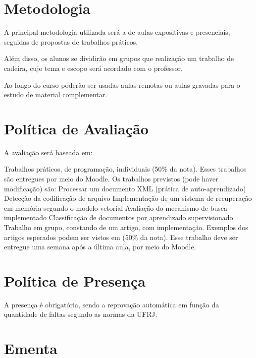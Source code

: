 \documentclass{article}
\begin{document}
\section{Metodologia}

A principal metodologia utilizada será a de aulas expositivas e presenciais, seguidas de propostas de trabalhos práticos.

Além disso, os alunos se dividirão em grupos que realização um trabalho de cadeira, cujo tema e escopo será acordado com o professor.

Ao longo do curso poderão ser usadas aulas remotas ou aulas gravadas para o estudo de material complementar.

\section{Política de Avaliação}

A avaliação será baseada em:
\begin{outline}
    \1 Trabalhos práticos, de programação, individuais (50\% da nota). Esses trabalhos são entregues por meio do Moodle. Os trabalhos previstos (pode haver modificação) são:
    \2 Processar um documento XML (prática de auto-aprendizado)
    \2 Detecção da codificação de arquivo
    \2 Implementação de um sistema de recuperação em memória segundo o modelo vetorial
    \2 Avaliação do mecanismo de busca implementado
    \2 Classificação de documentos por aprendizado supervisionado 
    \1 Trabalho em grupo, constando de um artigo, com implementação. Exemplos dos artigos esperados podem ser vistos em \citep{xexeo2022} (50\% da nota). Esse trabalho deve ser entregue uma semana após a última aula, por meio do Moodle.
\end{outline}

\section{Política de Presença}

A presença é obrigatória, sendo a reprovação automática em função da quantidade de faltas segundo as normas da UFRJ.

\section{Ementa}
\end{document}
